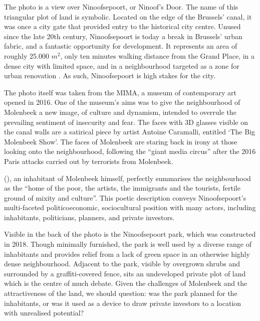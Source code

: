 \documentclass{article}[11pt]
\begin{document}
The photo is a view over Ninoofsepoort, or Ninoof's Door. The name of this triangular plot of land is symbolic. Located on the edge of the Brussels' canal, it was once a city gate that provided entry to the historical city centre. Unused since the late 20th century, Ninoofsepoort is today a break in Brussels' urban fabric, and a fantastic opportunity for development. It represents an area of roughly 25.000 $m^2$, only ten minutes walking distance from the Grand Place, in a dense city with limited space, and in a neighbourhood targeted as a zone for urban renovation \parencite{perspective2020zru}. As such, Ninoofsepoort is high stakes for the city.

The photo itself was taken from the MIMA, a museum of contemporary art opened in 2016. One of the museum's aims was to give the neighbourhood of Molenbeek a new image, of culture and dynamism, intended to overrule the prevailing sentiment of insecurity and fear. The faces with 3D glasses visible on the canal walls are a satirical piece by artist Antoine Caramalli, entitled `The Big Molenbeek Show'. The faces of Molenbeek are staring back in irony at those looking onto the neighbourhood, following the ``giant media circus''\parencite{antoine2016canal} after the 2016 Paris attacks carried out by terrorists from Molenbeek.

\citeauthor{antoine2016canal} (\citeyear{antoine2016canal}), an inhabitant of Molenbeek himself, perfectly summarises the neighbourhood as the ``home of the poor, the artists, the immigrants and the tourists, fertile ground of mixity and culture''.
This poetic description conveys Ninoofsepoort's multi-faceted politicoeconomic, sociocultural position with many actors, including inhabitants, politicians, planners, and private investors.

Visible in the back of the photo is the Ninoofsepoort park, which was constructed in 2018. Though minimally furnished, the park is well used by a diverse range of inhabitants and provides relief from a lack of green space in an otherwise highly dense neighbourhood.
Adjacent to the park, visible by overgrown shrubs and surrounded by a graffiti-covered fence, sits an undeveloped private plot of land which is the centre of much debate. 
Given the challenges of Molenbeek and the attractiveness of the land, we should question: was the park planned for the inhabitants, or was it used as a device to draw private investors to a location with unrealised potential?
\end{document}
